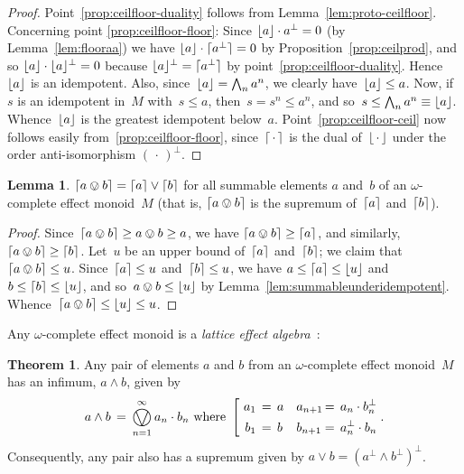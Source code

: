 \documentclass[10pt,conference]{IEEEtran}
\DeclarePairedDelimiter{\ceil}{\lceil}{\rceil}
\DeclarePairedDelimiter{\floor}{\lfloor}{\rfloor}
\newcounter{counter}
\theoremstyle{definition}
\newtheorem{theorem}[counter]{Theorem}
\newtheorem{lemma}[counter]{Lemma}
\newcommand{\bigovee}{\mathop{\vphantom{\sum}\mathchoice%
        {\vcenter{\hbox{\huge $\ovee$}}}%
        {\vcenter{\hbox{\Large $\ovee$}}}%
        {\ovee}{\ovee}}\displaylimits}
\begin{document}
\begin{proof}
Point~\ref{prop:ceilfloor-duality}
    follows from Lemma~\ref{lem:proto-ceilfloor}.
Concerning point \ref{prop:ceilfloor-floor}:
Since $\floor{a} \cdot a^\perp = 0$
    (by Lemma~\ref{lem:flooraa})
    we have $\floor{a}\cdot \ceil{a^\perp}=0$
    by Proposition~\ref{prop:ceilprod},
    and so $\floor{a}\cdot \floor{a}^\perp=0$
    because
     $\floor{a}^\perp = \ceil{a^\perp}$
     by point~\ref{prop:ceilfloor-duality}. Hence $\floor{a}$ is an idempotent.
Also, 
since~$\floor{a}=\bigwedge_n a^n$,
we clearly have~$\floor{a}\leq a$.
Now,
if~$s$ is an idempotent in~$M$
with~$s\leq a$,
then~$s=s^n\leq a^n$,
and so~$s\leq \bigwedge_n a^n\equiv \floor{a}$.
Whence~$\floor{a}$ is the greatest idempotent below~$a$.
Point~\ref{prop:ceilfloor-ceil}
now follows easily from~\ref{prop:ceilfloor-floor},
    since~$\ceil{\,\cdot\,}$ is the dual of~$\floor{\,\cdot\,}$
    under the order anti-isomorphism $(\,\cdot\,)^\perp$.
\end{proof}
\begin{lemma}\label{lem:sumofceil}
$\ceil{a\ovee b}=\ceil{a}\vee \ceil{b}$
for all summable
    elements $a$ and~$b$ of an $\omega$-complete effect monoid~$M$
    (that is,
    $\ceil{a\ovee b}$ is the supremum of~$\ceil{a}$ and~$\ceil{b}$).
\end{lemma}
\begin{proof}
Since~$\ceil{a\ovee b}\geq a\ovee b \geq a$,
    we have $\ceil{a\ovee b } \geq \ceil{a}$,
    and similarly, $\ceil{a\ovee b}\geq \ceil{b}$.
Let~$u$ be an upper bound of~$\ceil{a}$ and~$\ceil{b}$;
    we claim that~$\ceil{a\ovee b}\leq u$.
    Since~$\ceil{a}\leq u$ and~$\ceil{b}\leq u$, 
    we have $a\leq \ceil{a}\leq \floor{u}$ and
    $b\leq \ceil{b}\leq \floor{u}$,
    and so~$a\ovee b\leq \floor{u}$ by Lemma~\ref{lem:summableunderidempotent}.
    Whence~$\ceil{a\ovee b}\leq \floor{u}\leq u$.
\end{proof}
Any $\omega$-complete effect monoid is a \emph{lattice effect algebra}~\cite{rievcanova2000generalization}:
\begin{theorem}\label{thm:latticeemon}
Any pair of elements $a$ and $b$ from an $\omega$-complete
effect monoid~$M$
has an infimum, $a\wedge b$, given by
$$
    a\wedge b\,=\, \bigovee_{n=1}^\infty a_n\cdot b_n
    \ \text{where}\ 
    \left[\ 
    \begin{alignedat}{3}
        a_1\,&=\, a \quad&& a_{n+1} \,&=\, a_n\cdot b_n^\perp \\
        b_1\,&=\, b && b_{n+1} \,&=\, a_n^\perp \cdot b_n
    \end{alignedat}\right..
$$
Consequently, any pair also has a supremum given by $a\vee b= (a^\perp \wedge b^\perp)^\perp$.
\end{theorem}
\end{document}

